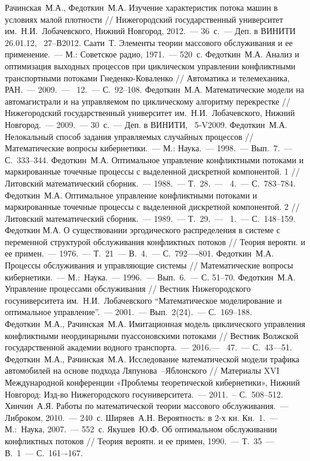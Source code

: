 \documentclass[a4paper,12pt,russian]{extarticle}
\newcommand{\No}{\textnumero}
\begin{document}
\begin{thebibliography}{99}
 Рачинская~М.А., Федоткин~М.А. Изучение характеристик потока машин в условиях малой плотности // Нижегородский государственный университет им.~Н.И.~Лобачевского, Нижний Новгород, 2012.~--- 36~с.~--- Деп. в ВИНИТИ 26.01.12, \No{}~27--В2012.
 Саати~Т. Элементы теории массового обслуживания и ее применение.~--- М.: Советское радио, 1971.~--- 520~с.
 Федоткин~М.А. Анализ и оптимизация выходных процессов при циклическом управлении конфликтными транспортными потоками Гнеденко-Коваленко  // Автоматика и телемеханика, РАН.~--- 2009.~--- \No{}~12.~--- С.~92--108.
 Федоткин~М.А. Математические модели на автомагистрали и на управляемом по циклическому алгоритму перекрестке // Нижегородский государственный университет им.~Н.И.~Лобачевского, Нижний Новгород.~--- 2009.~--- 30~с.~--- Деп. в ВИНИТИ, \No{}~5-V2009.
 Федоткин~М.А. Нелокальный способ задания управляемых случайных процессов // Математические вопросы кибернетики.~--- М.: Наука.~--- 1998.~--- Вып.~7.~--- С.~333--344.
 Федоткин~М.А. Оптимальное управление конфликтными потоками и маркированные точечные процессы с выделенной дискретной компонентой. 1 // Литовский математический сборник.~--- 1988.~--- Т.~28.~--- \No{}~4.~--- С.~783--784.
 Федоткин~М.А. Оптимальное управление конфликтными потоками и маркированные точечные процессы с выделенной дискретной компонентой. 2 // Литовский математический сборник.~--- 1989.~--- Т.~29.~--- \No{}~1.~--- С.~148--159.
 Федоткин М.А. О существовании эргодического распределения в системе с переменной структурой обслуживания конфликтных потоков // Теория вероятн. и ее примен.~--- 1976.~--- Т.~21~--- В.~4.~--- С.~792—-801.
 Федоткин~М.А. Процессы обслуживания и управляющие системы // Математические вопросы кибернетики.~--- М.:~Наука.~--- 1996.~--- Вып.~6.~--- С. 51--70.
 Федоткин~М.А. Управление процессами обслуживания // Вестник Нижегородского госуниверситета им.~Н.И.~Лобачевского “Математическое моделирование и оптимальное управление”.~--- 2001.~--- Вып.~2(24).~--- С.~169--188.
 Федоткин~М.А., Рачинская~М.А. Имитационная модель циклического управления конфликтными неординарными пуассоновскими потоками // Вестник Волжской государственной академии водного транспорта.~---
2016.--- \No{}~47.~--- С.~43---51.
 Федоткин~М.А., Рачинская~М.А. Исследование математической модели трафика автомобилей на основе подхода Ляпунова~--Яблонского // Материалы XVI Международной конференции «Проблемы теоретической кибернетики», Нижний Новгород: Изд-во Нижегородского госуниверситета.~--- 2011.~-- С.~508--512.
 Хинчин~А.Я. Работы по математической теории массового обслуживания.~--- Либроком, 2010.~--- 240~с.
 Ширяев~А.Н. Вероятность: в 2-х кн. Кн.~1.~--- М.:~Наука, 2007.~--- 552~с.
 Якушев~Ю.Ф. Об оптимальном обслуживании конфликтных потоков //  Теория вероятн. и ее примен, 1990.~--- Т.~35~--- В.~1~--- С.~161–-167.





\end{thebibliography}
\end{document}

